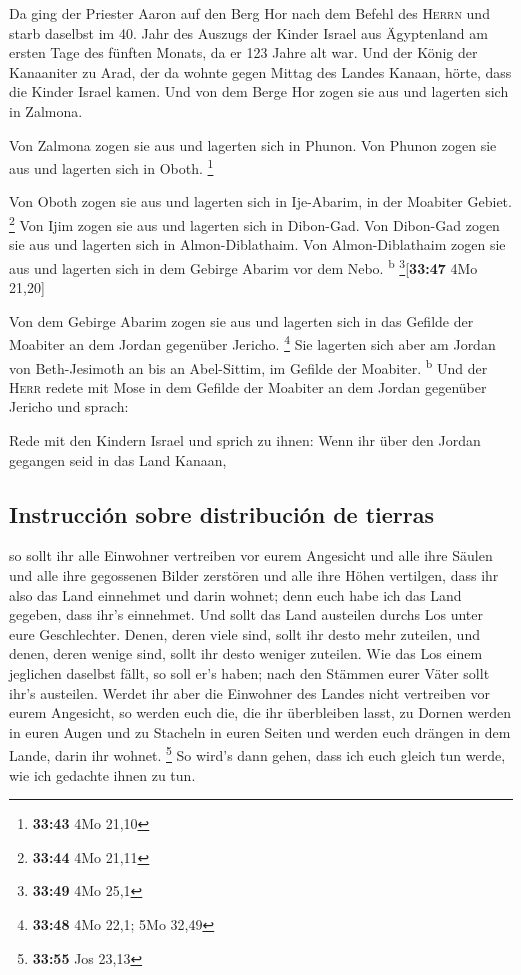  Da ging der Priester Aaron auf den Berg Hor nach dem
Befehl des \textsc{Herrn} und starb daselbst im 40. Jahr des Auszugs der
Kinder Israel aus Ägyptenland am ersten Tage des fünften Monats,
 da er 123 Jahre alt war.  Und der König
der Kanaaniter zu Arad, der da wohnte gegen Mittag des Landes Kanaan,
hörte, dass die Kinder Israel kamen.  Und von dem Berge
Hor zogen sie aus und lagerten sich in Zalmona.

 Von Zalmona zogen sie aus und lagerten sich in Phunon.
 Von Phunon zogen sie aus und lagerten sich in Oboth.
\footnote{\textbf{33:43} 4Mo 21,10}

 Von Oboth zogen sie aus und lagerten sich in Ije-Abarim,
in der Moabiter Gebiet. \footnote{\textbf{33:44} 4Mo 21,11}
 Von Ijim zogen sie aus und lagerten sich in Dibon-Gad.
 Von Dibon-Gad zogen sie aus und lagerten sich in
Almon-Diblathaim.  Von Almon-Diblathaim zogen sie aus und
lagerten sich in dem Gebirge Abarim vor dem Nebo. \textsuperscript{b}
\footnote{\textbf{33:49} 4Mo 25,1}{[}\textbf{33:47} 4Mo 21,20{]}

 Von dem Gebirge Abarim zogen sie aus und lagerten sich
in das Gefilde der Moabiter an dem Jordan gegenüber Jericho. \footnote{\textbf{33:48}
  4Mo 22,1; 5Mo 32,49}  Sie lagerten sich aber am Jordan
von Beth-Jesimoth an bis an Abel-Sittim, im Gefilde der Moabiter.
\textsuperscript{b}  Und der \textsc{Herr} redete mit
Mose in dem Gefilde der Moabiter an dem Jordan gegenüber Jericho und
sprach:

 Rede mit den Kindern Israel und sprich zu ihnen: Wenn
ihr über den Jordan gegangen seid in das Land Kanaan,

\hypertarget{instrucciuxf3n-sobre-distribuciuxf3n-de-tierras}{%
\subsection{Instrucción sobre distribución de
tierras}\label{instrucciuxf3n-sobre-distribuciuxf3n-de-tierras}}

 so sollt ihr alle Einwohner vertreiben vor eurem
Angesicht und alle ihre Säulen und alle ihre gegossenen Bilder zerstören
und alle ihre Höhen vertilgen,  dass ihr also das Land
einnehmet und darin wohnet; denn euch habe ich das Land gegeben, dass
ihr's einnehmet.  Und sollt das Land austeilen durchs Los
unter eure Geschlechter. Denen, deren viele sind, sollt ihr desto mehr
zuteilen, und denen, deren wenige sind, sollt ihr desto weniger
zuteilen. Wie das Los einem jeglichen daselbst fällt, so soll er's
haben; nach den Stämmen eurer Väter sollt ihr's austeilen.
 Werdet ihr aber die Einwohner des Landes nicht
vertreiben vor eurem Angesicht, so werden euch die, die ihr überbleiben
lasst, zu Dornen werden in euren Augen und zu Stacheln in euren Seiten
und werden euch drängen in dem Lande, darin ihr wohnet. \footnote{\textbf{33:55}
  Jos 23,13}  So wird's dann gehen, dass ich euch gleich
tun werde, wie ich gedachte ihnen zu tun.

